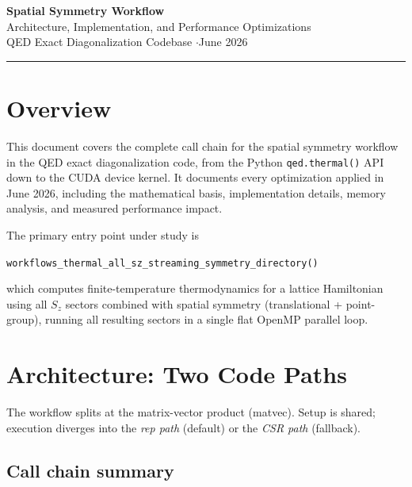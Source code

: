 \documentclass[11pt,a4paper]{article}
\begin{document}
\begin{center}
  {\LARGE\bfseries Spatial Symmetry Workflow}\\[4pt]
  {\large Architecture, Implementation, and Performance Optimizations}\\[8pt]
  {\normalsize QED Exact Diagonalization Codebase \quad$\cdot$\quad June 2026}
\end{center}

\vspace{8pt}
\hrule
\vspace{12pt}

\tableofcontents

\newpage

\section{Overview}

This document covers the complete call chain for the spatial symmetry workflow
in the QED exact diagonalization code, from the Python \texttt{qed.thermal()}
API down to the CUDA device kernel.  It documents every optimization applied in
June 2026, including the mathematical basis, implementation details, memory
analysis, and measured performance impact.

The primary entry point under study is
\begin{center}
\texttt{workflows\_thermal\_all\_sz\_streaming\_symmetry\_directory()}
\end{center}
which computes finite-temperature thermodynamics for a lattice Hamiltonian using
all $S_z$ sectors combined with spatial symmetry (translational + point-group),
running all resulting sectors in a single flat OpenMP parallel loop.

\section{Architecture: Two Code Paths}
\label{sec:arch}

The workflow splits at the matrix-vector product (matvec).  Setup is shared;
execution diverges into the \emph{rep path} (default) or the \emph{CSR path}
(fallback).

\subsection{Call chain summary}
\end{document}
